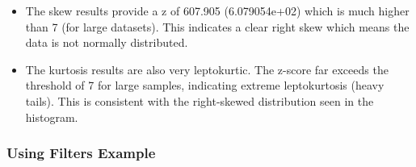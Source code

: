 \documentclass[
  letterpaper,
  DIV=11,
  numbers=noendperiod]{scrreprt}
\providecommand{\tightlist}{%
  \setlength{\itemsep}{0pt}\setlength{\parskip}{0pt}}\usepackage{longtable,booktabs,array}
\begin{document}
\begin{itemize}
\tightlist
\item
  The skew results provide a z of 607.905 (6.079054e+02) which is much
  higher than 7 (for large datasets). This indicates a clear right skew
  which means the data is not normally distributed.
\item
  The kurtosis results are also very leptokurtic. The z-score far
  exceeds the threshold of 7 for large samples, indicating extreme
  leptokurtosis (heavy tails). This is consistent with the right-skewed
  distribution seen in the histogram.
\end{itemize}

\subsubsection{Using Filters Example}\label{using-filters-example}
\end{document}
